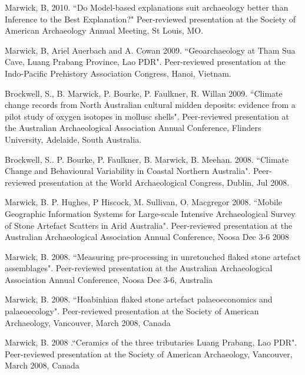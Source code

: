 \documentclass[11pt,article,oneside]{memoir}
\begin{document}
\ind Marwick, B, 2010. ``Do Model-based explanations suit archaeology better than Inference to the Best Explanation?" Peer-reviewed presentation at the Society of American Archaeology Annual Meeting, St Louis, MO.

\ind Marwick, B, Ariel Auerbach and A. Cowan 2009. ``Geoarchaeology at Tham Sua Cave, Luang Prabang Province, Lao PDR". Peer-reviewed presentation at the Indo-Pacific Prehistory Association Congress, Hanoi, Vietnam.

\ind Brockwell, S., B. Marwick, P. Bourke, P. Faulkner, R. Willan 2009. ``Climate change records from North Australian cultural midden deposits: evidence from a pilot study of oxygen isotopes in mollusc shells". Peer-reviewed presentation  at the Australian Archaeological Association Annual Conference, Flinders University, Adelaide, South Australia.

\ind Brockwell, S.. P. Bourke, P. Faulkner, B. Marwick, B. Meehan. 2008. ``Climate Change and Behavioural Variability in Coastal Northern Australia". Peer-reviewed presentation at the World Archaeological Congress, Dublin,  Jul 2008. 

\ind Marwick, B. P. Hughes, P Hiscock, M. Sullivan, O. Macgregor 2008. ``Mobile Geographic Information Systems for Large-scale Intensive Archaeological Survey of Stone Artefact Scatters in Arid Australia". Peer-reviewed presentation at the Australian Archaeological Association Annual Conference, Noosa Dec 3-6 2008

\ind Marwick, B. 2008. ``Measuring pre-processing in unretouched flaked stone artefact assemblages". Peer-reviewed presentation at the Australian Archaeological Association Annual Conference, Noosa Dec 3-6, Australia

\ind Marwick, B. 2008. ``Hoabinhian flaked stone artefact palaeoeconomics and palaeoecology". Peer-reviewed presentation at the Society of American Archaeology, Vancouver, March 2008, Canada

\ind Marwick, B. 2008 .``Ceramics of the three tributaries Luang Prabang, Lao PDR". Peer-reviewed presentation at the  Society of American Archaeology, Vancouver, March 2008, Canada

 \bigskip
 
 
\end{document}
